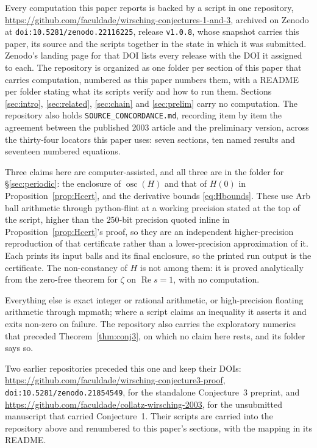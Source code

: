 \documentclass[11pt]{article}
\theoremstyle{definition}
\theoremstyle{remark}
\begin{document}
\begin{sloppypar}
Every computation this paper reports is backed by a script in one
repository, \url{https://github.com/faculdade/wirsching-conjectures-1-and-3},
archived on Zenodo at \texttt{doi:10.5281/zenodo.22116225}, release
\texttt{v1.0.8}, whose snapshot carries this paper, its source and the
scripts together in the state in which it was submitted. Zenodo's
landing page for that DOI lists every release with the DOI it assigned
to each. The repository is organized as one folder per section of
this paper that carries computation, numbered as this paper numbers
them, with a README per folder stating what its scripts verify and how
to run them. Sections \ref{sec:intro}, \ref{sec:related},
\ref{sec:chain} and \ref{sec:prelim} carry no computation. The
repository also holds \texttt{SOURCE\_CONCORDANCE.md}, recording
item by item the agreement between the published 2003 article and the
preliminary version, across the thirty-four locators this paper uses:
seven sections, ten named results and seventeen numbered equations.
\end{sloppypar}

Three claims here are computer-assisted, and all three are in the folder
for \S\ref{sec:periodic}: the enclosure of $\operatorname{osc}(H)$ and
that of $H(0)$ in Proposition~\ref{prop:Hcert}, and the derivative
bounds \eqref{eq:Hbounds}. These use Arb ball arithmetic through python-flint
at a working precision stated at the top of the script, higher than the
$250$-bit precision quoted inline in Proposition~\ref{prop:Hcert}'s
proof, so they are an independent higher-precision reproduction of that
certificate rather than a lower-precision approximation of it. Each
prints its input balls and its final enclosure, so the printed run
output is the certificate. The non-constancy of $H$ is not among them:
it is proved analytically from the zero-free theorem for $\zeta$ on
$\operatorname{Re}s=1$, with no computation.

Everything else is exact integer or rational arithmetic, or
high-precision floating arithmetic through mpmath; where a script claims
an inequality it asserts it and exits non-zero on failure. The
repository also carries the exploratory numerics that preceded
Theorem~\ref{thm:conj3}, on which no claim here rests, and its folder
says so.

Two earlier repositories preceded this one and keep their DOIs:
\url{https://github.com/faculdade/wirsching-conjecture3-proof},
\texttt{doi:10.5281/zenodo.21854549}, for the standalone Conjecture~3
preprint, and
\url{https://github.com/faculdade/collatz-wirsching-2003}, for the
unsubmitted manuscript that carried Conjecture~1. Their scripts are
carried into the repository above and renumbered to this paper's
sections, with the mapping in its README.
\end{document}
